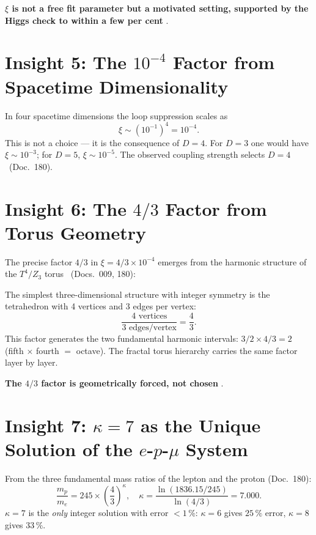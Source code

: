 \textbf{$\xi$ is not a free fit parameter but a motivated setting,
supported by the Higgs check to within a few per cent} \SM.

\section{Insight 5: The $10^{-4}$ Factor from Spacetime Dimensionality}

In four spacetime dimensions the loop suppression scales as
\begin{equation}
  \xi \sim (10^{-1})^4 = 10^{-4}.
  \label{eq:4d_factor}
\end{equation}
This is not a choice --- it is the consequence of $D = 4$. For $D = 3$
one would have $\xi \sim 10^{-3}$; for $D = 5$, $\xi \sim 10^{-5}$.
The observed coupling strength selects $D = 4$ \BM\ (Doc.~180).

\section{Insight 6: The $4/3$ Factor from Torus Geometry}

The precise factor $4/3$ in $\xi = 4/3 \times 10^{-4}$ emerges from the
harmonic structure of the $T^4/Z_3$ torus \BM\ (Docs.~009, 180):

The simplest three-dimensional structure with integer symmetry is the
tetrahedron with 4 vertices and 3 edges per vertex:
\begin{equation}
  \frac{4\text{ vertices}}{3\text{ edges/vertex}} = \frac{4}{3}.
  \label{eq:tetrahedron}
\end{equation}
This factor generates the two fundamental harmonic intervals:
$3/2 \times 4/3 = 2$ (fifth $\times$ fourth $=$ octave). The fractal
torus hierarchy carries the same factor layer by layer.

\textbf{The $4/3$ factor is geometrically forced, not chosen} \BM.

\section{Insight 7: $\kappa = 7$ as the Unique Solution of the $e$-$p$-$\mu$ System}

From the three fundamental mass ratios of the lepton and the proton
(Doc.~180):
\begin{equation}
  \frac{m_p}{m_e} = 245\times\left(\frac{4}{3}\right)^\kappa,
  \quad
  \kappa = \frac{\ln(1836.15/245)}{\ln(4/3)} = 7.000.
  \label{eq:kappa7}
\end{equation}
$\kappa = 7$ is the \emph{only} integer solution with error $<1\,\%$:
$\kappa = 6$ gives $25\,\%$ error, $\kappa = 8$ gives $33\,\%$.

